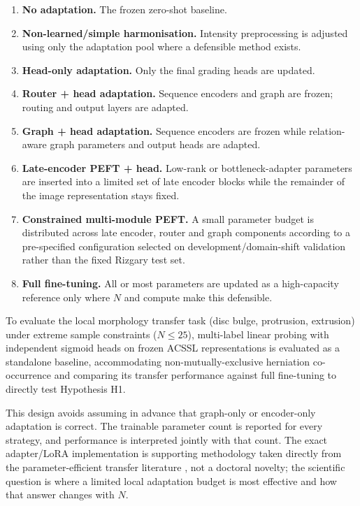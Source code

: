 \begin{enumerate}
  \item \textbf{No adaptation.} The frozen zero-shot baseline.
  \item \textbf{Non-learned/simple harmonisation.} Intensity preprocessing is
        adjusted using only the adaptation pool where a defensible method exists.
  \item \textbf{Head-only adaptation.} Only the final grading heads are updated.
  \item \textbf{Router + head adaptation.} Sequence encoders and graph are
        frozen; routing and output layers are adapted.
  \item \textbf{Graph + head adaptation.} Sequence encoders are frozen while
        relation-aware graph parameters and output heads are adapted.
  \item \textbf{Late-encoder PEFT + head.} Low-rank \cite{hu2022lora} or
        bottleneck-adapter \cite{houlsby2019parameterefficient} parameters are
        inserted into a limited set of late encoder blocks while the remainder
        of the image representation stays fixed.
  \item \textbf{Constrained multi-module PEFT.} A small parameter budget is
        distributed across late encoder, router and graph components according
        to a pre-specified configuration selected on development/domain-shift
        validation rather than the fixed Rizgary test set.
  \item \textbf{Full fine-tuning.} All or most parameters are updated as a
        high-capacity reference only where $N$ and compute make this defensible.
\end{enumerate}

To evaluate the local morphology transfer task (disc bulge, protrusion,
extrusion) under extreme sample constraints ($N \le 25$), multi-label linear
probing with independent sigmoid heads on frozen ACSSL representations is
evaluated as a standalone baseline, accommodating non-mutually-exclusive
herniation co-occurrence and comparing its transfer performance against full
fine-tuning to directly test Hypothesis H1.

This design avoids assuming in advance that graph-only or encoder-only
adaptation is correct. The trainable parameter count is reported for every
strategy, and performance is interpreted jointly with that count. The exact
adapter/LoRA implementation is supporting methodology taken directly from the
parameter-efficient transfer literature
\cite{houlsby2019parameterefficient,hu2022lora}, not a doctoral novelty;
the scientific question is where a limited local adaptation budget is most
effective and how that answer changes with $N$.


